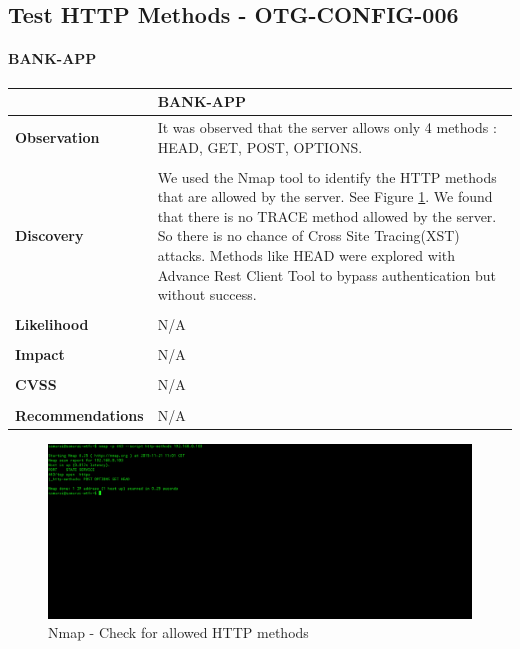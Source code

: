 \subsection{Test HTTP Methods - OTG-CONFIG-006}
\paragraph{BANK-APP} \mbox{}
\begin{longtable*}{p{.30\textwidth} | p{.70\textwidth}}
    \hline
    & \textbf{BANK-APP} \\
    \hline
    \textbf{Observation} &
     It was observed that the server allows only 4 methods : HEAD, GET, POST, OPTIONS.
    \\\\
    \textbf{Discovery} &
       We used the Nmap tool to identify the HTTP methods that are allowed by the server. See Figure \ref{fig:nmap_http_methods}. We found that there is no TRACE method allowed by the server. So there is no chance of Cross Site Tracing(XST) attacks. Methods like HEAD were explored with Advance Rest Client Tool to bypass authentication but without success.
    \\\\
    \textbf{Likelihood} &
        N/A
    \\\\
    \textbf{Impact} &
       N/A
    \\\\
    \textbf{CVSS} &
       N/A
    \\\\
    \textbf{Recommendations} &
      N/A\\
    	\hline
\end{longtable*}
\begin{figure}[ht]
	\centering
		\includegraphics[width=.8\linewidth]{figures/OTG-CONFIG-006.png}
		\caption{Nmap - Check for allowed HTTP methods}
	\label{fig:nmap_http_methods}
\end{figure}
\clearpage
